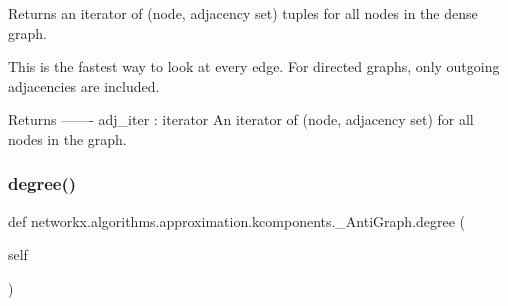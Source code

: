 \begin{DoxyVerb}Returns an iterator of (node, adjacency set) tuples for all nodes
   in the dense graph.

This is the fastest way to look at every edge.
For directed graphs, only outgoing adjacencies are included.

Returns
-------
adj_iter : iterator
   An iterator of (node, adjacency set) for all nodes in
   the graph.\end{DoxyVerb}
 \mbox{\label{classnetworkx_1_1algorithms_1_1approximation_1_1kcomponents_1_1__AntiGraph_ac8f0731c9eb95e35863a7ff414f5b37c}} 
\subsubsection{\texorpdfstring{degree()}{degree()}}
{\footnotesize\ttfamily def networkx.\+algorithms.\+approximation.\+kcomponents.\+\_\+\+Anti\+Graph.\+degree (\begin{DoxyParamCaption}\item[{}]{self }\end{DoxyParamCaption})}

